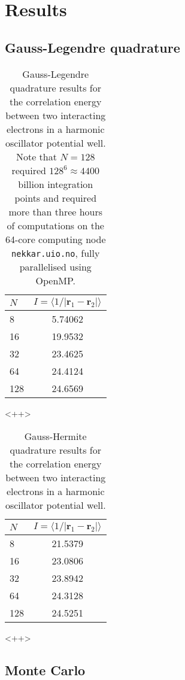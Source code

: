\documentclass[a4paper,11pt]{article}
\begin{document}
\section{Results}
\subsection{Gauss-Legendre quadrature}

\begin{table}
    \centering
    \caption{Gauss-Legendre quadrature results for the correlation energy between two interacting electrons in a harmonic oscillator potential well. Note that $N=128$ required $128^6 \approx 4400$ billion integration points and required more than three hours of computations on the 64-core computing node \texttt{nekkar.uio.no}, fully parallelised using OpenMP.}
    \begin{tabular}{l c}
        \hline
        $N$ & $I = \langle 1/|\mathbf{r}_1 - \mathbf{r}_2| \rangle$ \\
        \hline
        8   &   5.74062 \\
        16  &   19.9532 \\
        32  &   23.4625 \\
        64  &   24.4124 \\
        128 &   24.6569 \\
        \hline
    \end{tabular}
    \label{tab:<+label+>}
\end{table}<++>

\begin{table}
    \centering
    \caption{Gauss-Hermite quadrature results for the correlation energy between two interacting electrons in a harmonic oscillator potential well.}
    \begin{tabular}{l c}
        \hline
        $N$ &   $I = \langle 1/|\mathbf{r}_1 - \mathbf{r}_2| \rangle$ \\
        \hline
        8   &   21.5379 \\
        16  &   23.0806 \\
        32  &   23.8942 \\
        64  &   24.3128 \\
        128 &   24.5251 \\
        \hline
    \end{tabular}
    \label{tab:<+label+>}
\end{table}<++>

\subsection{Monte Carlo}
\end{document}
